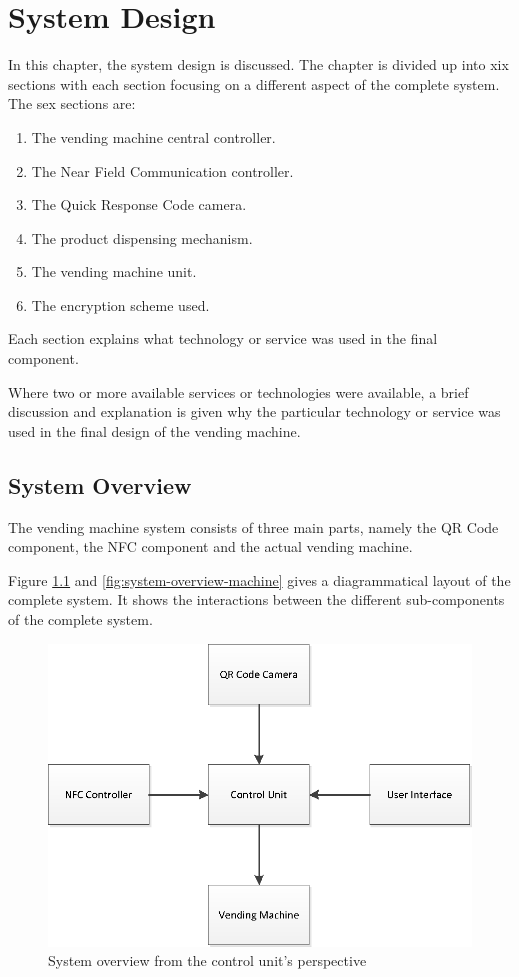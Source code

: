 \chapter{System Design}

In this chapter, the system design is discussed. The chapter is divided up into 
xix sections with each section focusing on a different aspect of the complete
system. The sex sections are:

\begin{enumerate}
  \item The vending machine central controller.
  \item The Near Field Communication controller.
  \item The Quick Response Code camera.
  \item The product dispensing mechanism.
  \item The vending machine unit.
  \item The encryption scheme used.
\end{enumerate}

Each section explains what technology or service was used in the final
component.

Where two or more available services or technologies were available,
a brief discussion and explanation is given why the particular technology or
service was used in the final design of the vending machine.

\section{System Overview}

The vending machine system consists of three main parts, namely the QR Code component, the NFC
component and the actual vending machine. 

Figure \ref{fig:system-overview-pi} and \ref{fig:system-overview-machine} gives a
diagrammatical layout of the complete system.
It shows the interactions between the different sub-components of the complete system.

\begin{figure}[h]
\centering
\includegraphics[scale=0.7]{pi_system_overview.eps}
\caption{System overview from the control unit's perspective}
\label{fig:system-overview-pi}
\end{figure}

